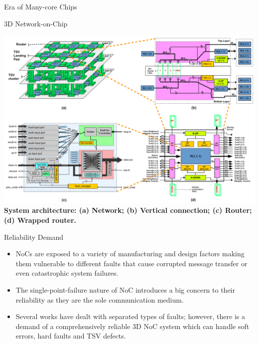\documentclass[a1paper,portrait]{baposter}
\let\oldtextbf\textbf
\renewcommand{\textbf}[1]{\textcolor{aaublue1}{\oldtextbf{#1}}}
\begin{document}
\begin{poster}
\begin{posterbox}[name=intro,column=0,row=0]{Era of Many-core Chips}
\end{posterbox}

\begin{posterbox}[name=3dnoc,column=0,below=intro]{3D Network-on-Chip}
    \begin{center}
        \includegraphics[width=1\linewidth]{figs/NoC2r.pdf}\\
        \textbf{\small System architecture: (a) Network; (b) Vertical connection; (c) Router; (d) Wrapped router.}
    \end{center}

\end{posterbox}



\begin{posterbox}[name=demand,column=0, below=3dnoc]{Reliability Demand}
\begin{itemize}
    \item NoCs are exposed to a variety of manufacturing and design factors making them vulnerable to different faults that cause corrupted message transfer or even catastrophic system failures.
    \item The single-point-failure nature of NoC introduces a big concern to their reliability as they are the sole communication medium. 
    \item Several works have dealt with separated types of faults; however, there is a demand of a comprehensively reliable 3D NoC system which can handle soft errors, hard faults and TSV defects.
\end{itemize}
\end{posterbox}




\end{poster}
\end{document}
